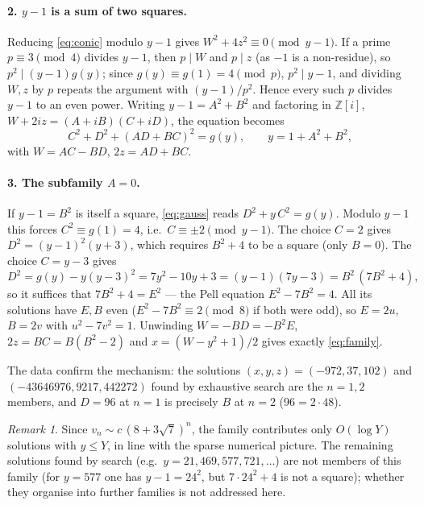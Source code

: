 \documentclass[11pt]{article}
\theoremstyle{remark}
\newtheorem{remark}[theorem]{Remark}
\begin{document}
\paragraph{2. $y-1$ is a sum of two squares.} Reducing \eqref{eq:conic} modulo $y-1$
gives $W^{2}+4z^{2}\equiv 0 \pmod{y-1}$. If a prime $p\equiv 3\pmod 4$ divides $y-1$,
then $p\mid W$ and $p\mid z$ (as $-1$ is a non-residue), so $p^{2}\mid (y-1)g(y)$; since
$g(y)\equiv g(1)=4\pmod p$, $p^{2}\mid y-1$, and dividing $W,z$ by $p$ repeats the argument
with $(y-1)/p^{2}$. Hence every such $p$ divides $y-1$ to an even power. Writing
$y-1=A^{2}+B^{2}$ and factoring in $\mathbb{Z}[i]$, $W+2iz=(A+iB)(C+iD)$, the equation becomes
\begin{equation}\label{eq:gauss}
C^{2}+D^{2}+(AD+BC)^{2}=g(y),\qquad y=1+A^{2}+B^{2},
\end{equation}
with $W=AC-BD$, $2z=AD+BC$.

\paragraph{3. The subfamily $A=0$.} If $y-1=B^{2}$ is itself a square,
\eqref{eq:gauss} reads $D^{2}+y\,C^{2}=g(y)$. Modulo $y-1$ this forces
$C^{2}\equiv g(1)=4$, i.e.\ $C\equiv\pm2\pmod{y-1}$. The choice $C=2$ gives
$D^{2}=(y-1)^{2}(y+3)$, which requires $B^{2}+4$ to be a square (only $B=0$).
The choice $C=y-3$ gives
\[
D^{2}=g(y)-y(y-3)^{2}=7y^{2}-10y+3=(y-1)(7y-3)=B^{2}\,(7B^{2}+4),
\]
so it suffices that $7B^{2}+4=E^{2}$ --- the Pell equation $E^{2}-7B^{2}=4$. All its
solutions have $E,B$ even ($E^{2}-7B^{2}\equiv 2\pmod 8$ if both were odd), so
$E=2u$, $B=2v$ with $u^{2}-7v^{2}=1$. Unwinding $W=-BD=-B^{2}E$, $2z=BC=B(B^{2}-2)$ and
$x=(W-y^{2}+1)/2$ gives exactly \eqref{eq:family}.

The data confirm the mechanism: the solutions $(x,y,z)=(-972,37,102)$ and
$(-43646976,9217,442272)$ found by exhaustive search are the $n=1,2$ members, and
$D=96$ at $n=1$ is precisely $B$ at $n=2$ ($96=2\cdot 48$).

\begin{remark}
Since $v_n\sim c\,(8+3\sqrt7)^{n}$, the family contributes only $O(\log Y)$ solutions
with $y\le Y$, in line with the sparse numerical picture. The remaining solutions found
by search (e.g.\ $y=21,469,577,721,\dots$) are not members of this family
(for $y=577$ one has $y-1=24^{2}$, but $7\cdot24^{2}+4$ is not a square); whether they
organise into further families is not addressed here.
\end{remark}
\end{document}
